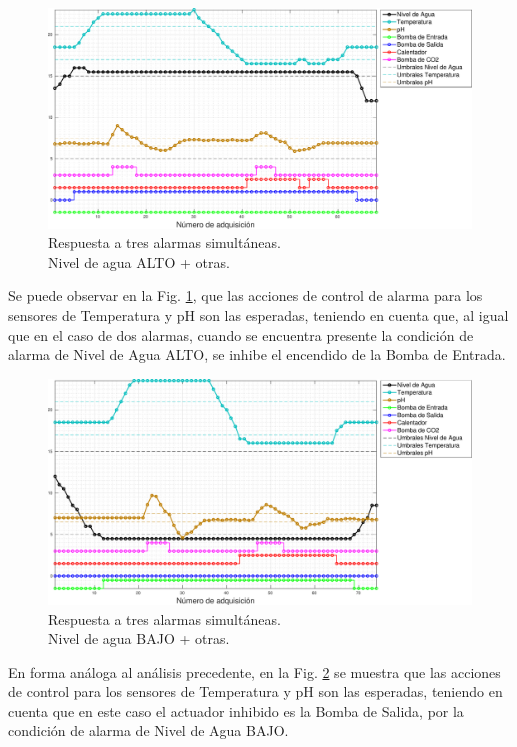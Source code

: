 \begin{figure}[h]
\centering
    \includegraphics[width=\textwidth]{./Figures/plot3waterHigh.pdf}
	\caption{Respuesta a tres alarmas simultáneas.\\ Nivel de agua ALTO + otras.}
	\label{fig:alarma3WaterHigh}
\end{figure}

Se puede observar en la Fig. \ref{fig:alarma3WaterHigh}, que las acciones de control de alarma  para los sensores de Temperatura y pH son las esperadas, teniendo en cuenta que, al igual que en el caso de dos alarmas, cuando se encuentra presente la condición de alarma de Nivel de Agua ALTO, se inhibe el encendido de la Bomba de Entrada.

\begin{figure}[H]
\centering
    \includegraphics[width=\textwidth]{./Figures/plot3waterLow.pdf}
	\caption{Respuesta a tres alarmas simultáneas.\\ Nivel de agua BAJO + otras.}
	\label{fig:alarma3WaterLow}
\end{figure}

En forma análoga al análisis precedente, en la Fig. \ref{fig:alarma3WaterLow} se muestra que las acciones de control para los sensores de Temperatura y pH son las esperadas, teniendo en cuenta que en este caso el actuador inhibido es la Bomba de Salida, por la condición de alarma de Nivel de Agua BAJO.
